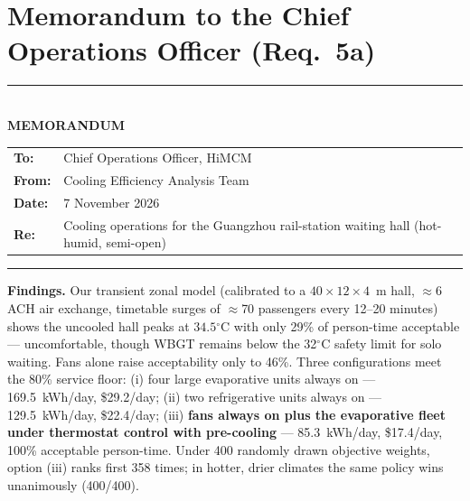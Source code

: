 \documentclass[11pt]{article}
\newcommand{\degrees}{\ensuremath{^\circ}}
\begin{document}
\section{Memorandum to the Chief Operations Officer (Req.\ 5a)}
\begin{center}
\rule{\linewidth}{0.8pt}\\[2pt]
\textbf{\large MEMORANDUM}\\[6pt]
\begin{tabular}{@{}ll@{}}
\textbf{To:} & Chief Operations Officer, HiMCM\\
\textbf{From:} & Cooling Efficiency Analysis Team\\
\textbf{Date:} & 7 November 2026\\
\textbf{Re:} & Cooling operations for the Guangzhou rail-station waiting hall (hot-humid, semi-open)\\
\end{tabular}
\rule{\linewidth}{0.4pt}
\end{center}

\textbf{Findings.} Our transient zonal model (calibrated to a $40\times12\times4$~m hall, $\approx$6 ACH air exchange, timetable surges of $\approx$70 passengers every 12--20 minutes) shows the uncooled hall peaks at $34.5\degrees$C with only 29\% of person-time acceptable --- uncomfortable, though WBGT remains below the 32$\degrees$C safety limit for solo waiting. Fans alone raise acceptability only to 46\%. Three configurations meet the 80\% service floor: (i) four large evaporative units always on --- 169.5~kWh/day, \$29.2/day; (ii) two refrigerative units always on --- 129.5~kWh/day, \$22.4/day; (iii) \textbf{fans always on plus the evaporative fleet under thermostat control with pre-cooling} --- 85.3~kWh/day, \$17.4/day, 100\% acceptable person-time. Under 400 randomly drawn objective weights, option (iii) ranks first 358 times; in hotter, drier climates the same policy wins unanimously (400/400).
\end{document}
